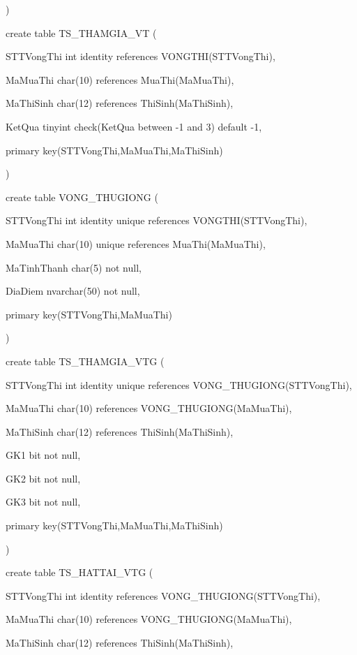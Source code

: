 \documentclass{report}
\begin{document}
	\setlength{\parindent}{0.5cm}
)

\bigskip

create table TS\_THAMGIA\_VT (

	\setlength{\parindent}{1.5cm}
	STTVongThi int identity references VONGTHI(STTVongThi),
	
	MaMuaThi char(10) references MuaThi(MaMuaThi),
	
	MaThiSinh char(12) references ThiSinh(MaThiSinh),
	
	KetQua tinyint check(KetQua between -1 and 3) default -1,
	
	primary key(STTVongThi,MaMuaThi,MaThiSinh)
	
	\setlength{\parindent}{0.5cm}
)

\bigskip

create table VONG\_THUGIONG (

	\setlength{\parindent}{1.5cm}
	STTVongThi int identity unique references VONGTHI(STTVongThi),
	
	MaMuaThi char(10) unique references MuaThi(MaMuaThi),
	
	MaTinhThanh char(5) not null,  
	
	DiaDiem nvarchar(50) not null,
	
	primary key(STTVongThi,MaMuaThi)
	
	\setlength{\parindent}{0.5cm}
)

\bigskip

create table TS\_THAMGIA\_VTG (

	\setlength{\parindent}{1.5cm}
	STTVongThi int identity unique references VONG\_THUGIONG(STTVongThi),
	
	MaMuaThi char(10) references VONG\_THUGIONG(MaMuaThi),
	
	MaThiSinh char(12) references ThiSinh(MaThiSinh),
	
	GK1 bit not null,
	
	GK2 bit not null,
	
	GK3 bit not null,
	
	primary key(STTVongThi,MaMuaThi,MaThiSinh)
	
	\setlength{\parindent}{0.5cm}
)

\bigskip

create table TS\_HATTAI\_VTG (

	\setlength{\parindent}{1.5cm}
	STTVongThi int identity references VONG\_THUGIONG(STTVongThi),
	
	MaMuaThi char(10) references VONG\_THUGIONG(MaMuaThi),
	
	MaThiSinh char(12) references ThiSinh(MaThiSinh),
	
\end{document}

